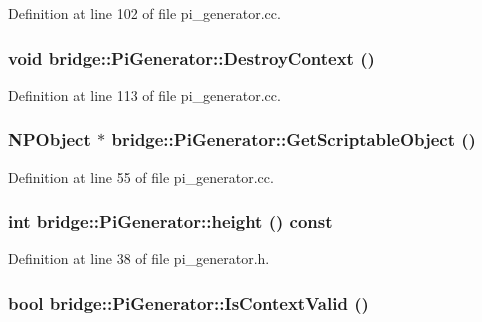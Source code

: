 Definition at line 102 of file pi\_\-generator.cc.

\hypertarget{classbridge_1_1_pi_generator_ad0299e34e6e407bdb4b10dd6b26772e1}{
\subsubsection[{DestroyContext}]{\setlength{\rightskip}{0pt plus 5cm}void bridge::PiGenerator::DestroyContext ()}}
\label{classbridge_1_1_pi_generator_ad0299e34e6e407bdb4b10dd6b26772e1}


Definition at line 113 of file pi\_\-generator.cc.

\hypertarget{classbridge_1_1_pi_generator_a3581dcfb54c3d716ca1d931d457fd59f}{
\subsubsection[{GetScriptableObject}]{\setlength{\rightskip}{0pt plus 5cm}NPObject $\ast$ bridge::PiGenerator::GetScriptableObject ()}}
\label{classbridge_1_1_pi_generator_a3581dcfb54c3d716ca1d931d457fd59f}


Definition at line 55 of file pi\_\-generator.cc.

\hypertarget{classbridge_1_1_pi_generator_a4f079f180ee84d53cab6df3f5baf7492}{
\subsubsection[{height}]{\setlength{\rightskip}{0pt plus 5cm}int bridge::PiGenerator::height () const}}
\label{classbridge_1_1_pi_generator_a4f079f180ee84d53cab6df3f5baf7492}


Definition at line 38 of file pi\_\-generator.h.

\hypertarget{classbridge_1_1_pi_generator_a500184b53b32eebd3cdd13f71cb811f5}{
\subsubsection[{IsContextValid}]{\setlength{\rightskip}{0pt plus 5cm}bool bridge::PiGenerator::IsContextValid ()}}
\label{classbridge_1_1_pi_generator_a500184b53b32eebd3cdd13f71cb811f5}


